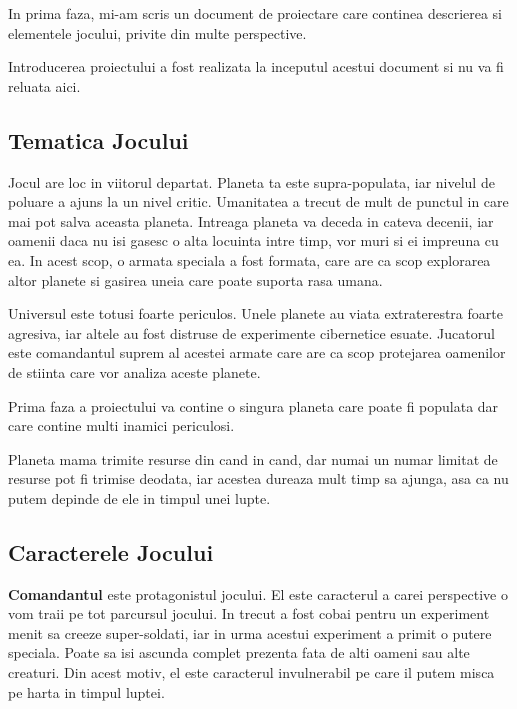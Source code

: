 \documentclass[12pt, a4paper]{article}
\begin{document}
	In prima faza, mi-am scris un document de proiectare care continea descrierea si elementele jocului, privite din multe perspective.
	
	Introducerea proiectului a fost realizata la inceputul acestui document si nu va fi reluata aici.
	
	
	
	\subsection{Tematica Jocului}
	
	Jocul are loc in viitorul departat. Planeta ta este supra-populata, iar nivelul de poluare a ajuns la un nivel critic. Umanitatea a trecut de mult de punctul in care mai pot salva aceasta planeta. Intreaga planeta va deceda in cateva decenii, iar oamenii daca nu isi gasesc o alta locuinta intre timp, vor muri si ei impreuna cu ea. In acest scop, o armata speciala a fost formata, care are ca scop explorarea altor planete si gasirea uneia care poate suporta rasa umana.
	
	Universul este totusi foarte periculos. Unele planete au viata extraterestra foarte agresiva, iar altele au fost distruse de experimente cibernetice esuate. Jucatorul este comandantul suprem al acestei armate care are ca scop protejarea oamenilor de stiinta care vor analiza aceste planete.
	
	Prima faza a proiectului va contine o singura planeta care poate fi populata dar care contine multi inamici periculosi.
	
	Planeta mama trimite resurse din cand in cand, dar numai un numar limitat de resurse pot fi trimise deodata, iar acestea dureaza mult timp sa ajunga, asa ca nu putem depinde de ele in timpul unei lupte.
	
	
	
	\subsection{Caracterele Jocului}
	
	\textbf{Comandantul} este protagonistul jocului. El este caracterul a carei perspective o vom traii pe tot parcursul jocului. In trecut a fost cobai pentru un experiment menit sa creeze super-soldati, iar in urma acestui experiment a primit o putere speciala. Poate sa isi ascunda complet prezenta fata de alti oameni sau alte creaturi. Din acest motiv, el este caracterul invulnerabil pe care il putem misca pe harta in timpul luptei.
	
\end{document}
